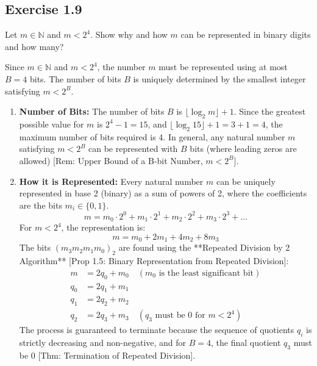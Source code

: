 \subsection*{Exercise 1.9}
Let $m \in \mathbb{N}$ and $m < 2^4$. Show why and how $m$ can be represented in binary digits and how many?

\begin{solution}
Since $m \in \mathbb{N}$ and $m < 2^4$, the number $m$ must be represented using at most $B=4$ bits. The number of bits $B$ is uniquely determined by the smallest integer satisfying $m < 2^B$.

\begin{enumerate}
    \item \textbf{Number of Bits:}
    The number of bits $B$ is $\lfloor \log_2 m \rfloor + 1$. Since the greatest possible value for $m$ is $2^4 - 1 = 15$, and $\lfloor \log_2 15 \rfloor + 1 = 3 + 1 = 4$, the maximum number of bits required is 4. In general, any natural number $m$ satisfying $m < 2^B$ can be represented with $B$ bits (where leading zeros are allowed) [Rem: Upper Bound of a B-bit Number, $m < 2^B$].

    \item \textbf{How it is Represented:}
    Every natural number $m$ can be uniquely represented in base 2 (binary) as a sum of powers of 2, where the coefficients are the bits $m_i \in \{0, 1\}$.
    $$m = m_0 \cdot 2^0 + m_1 \cdot 2^1 + m_2 \cdot 2^2 + m_3 \cdot 2^3 + \dots$$
    For $m < 2^4$, the representation is:
    $$m = m_0 + 2m_1 + 4m_2 + 8m_3$$
    The bits $(m_3 m_2 m_1 m_0)_2$ are found using the **Repeated Division by 2 Algorithm** [Prop 1.5: Binary Representation from Repeated Division]:
    \begin{align*}
        m &= 2q_0 + m_0 \quad (m_0 \text{ is the least significant bit}) \\
        q_0 &= 2q_1 + m_1 \\
        q_1 &= 2q_2 + m_2 \\
        q_2 &= 2q_3 + m_3 \quad (q_3 \text{ must be 0 for } m < 2^4)
    \end{align*}
    The process is guaranteed to terminate because the sequence of quotients $q_i$ is strictly decreasing and non-negative, and for $B=4$, the final quotient $q_3$ must be 0 [Thm: Termination of Repeated Division].
\end{enumerate}
\end{solution}
